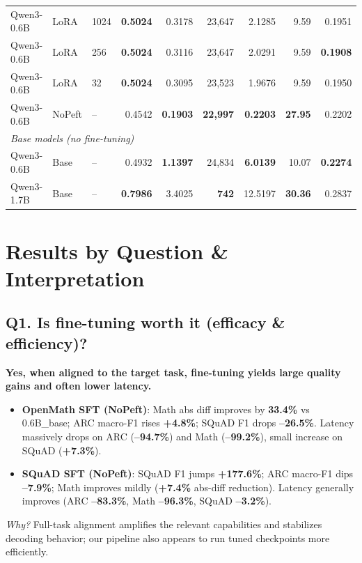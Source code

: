 \documentclass[11pt,a4paper]{article}
\begin{document}
\begin{table}[H]
\begin{adjustbox}{max width=\textwidth}
\begin{tabular}{lllrrrrrr}
Qwen3-0.6B & LoRA   & 1024 & \textbf{0.5024} & 0.3178 & 23{,}647 & 2.1285 & 9.59 & 0.1951 \\
Qwen3-0.6B & LoRA   & 256  & \textbf{0.5024} & 0.3116 & 23{,}647 & 2.0291 & 9.59 & \textbf{0.1908} \\
Qwen3-0.6B & LoRA   & 32   & \textbf{0.5024} & 0.3095 & 23{,}523 & 1.9676 & 9.59 & 0.1950 \\
Qwen3-0.6B & NoPeft & --   & 0.4542 & \textbf{0.1903} & \textbf{22{,}997} & \textbf{0.2203} & \textbf{27.95} & 0.2202 \\
\midrule
\multicolumn{9}{l}{\textit{Base models (no fine-tuning)}} \\
Qwen3-0.6B & Base   & --   & 0.4932 & \textbf{1.1397} & 24{,}834 & \textbf{6.0139} & 10.07 & \textbf{0.2274} \\
Qwen3-1.7B & Base   & --   & \textbf{0.7986} & 3.4025 & \textbf{742} & 12.5197 & \textbf{30.36} & 0.2837 \\
\bottomrule
\end{tabular}
\end{adjustbox}
\end{table}

\section{Results by Question \& Interpretation}

\subsection*{Q1. Is fine-tuning worth it (efficacy \& efficiency)?}
\textbf{Yes, when aligned to the target task, fine-tuning yields large quality gains and often lower latency.} 
\begin{itemize}
  \item \textbf{OpenMath SFT (NoPeft)}: Math abs diff improves by \textbf{33.4\%} vs 0.6B\_base; ARC macro-F1 rises \textbf{+4.8\%}; SQuAD F1 drops \textbf{--26.5\%}. Latency massively drops on ARC (\textbf{--94.7\%}) and Math (\textbf{--99.2\%}), small increase on SQuAD (\textbf{+7.3\%}).
  \item \textbf{SQuAD SFT (NoPeft)}: SQuAD F1 jumps \textbf{+177.6\%}; ARC macro-F1 dips \textbf{--7.9\%}; Math improves mildly (\textbf{+7.4\%} abs-diff reduction). Latency generally improves (ARC \textbf{--83.3\%}, Math \textbf{--96.3\%}, SQuAD \textbf{--3.2\%}).
\end{itemize}
\textit{Why?} Full-task alignment amplifies the relevant capabilities and stabilizes decoding behavior; our pipeline also appears to run tuned checkpoints more efficiently.
\end{document}
